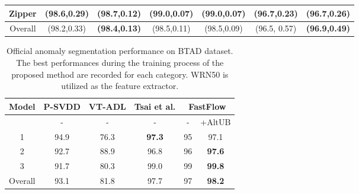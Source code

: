 \documentclass[letterpaper]{article}
\begin{document}
\begin{table*}[t]
\begin{tabular}{c|cccc|cc}
Zipper     & \multicolumn{1}{c}{(98.6,0.29)}          & \multicolumn{1}{c|}{\textbf{(98.7,0.12)}} & \multicolumn{1}{c}{(99.0,0.07)} & \multicolumn{1}{c|}{(99.0,0.07)}          & \multicolumn{1}{c}{(96.7,0.23)}  & (96.7,0.26)          \\ \hline
Overall    & \multicolumn{1}{c}{(98.2,0.33)}          & \multicolumn{1}{c|}{\textbf{(98.4,0.13)}} & \multicolumn{1}{c}{(98.5,0.11)} & \multicolumn{1}{c|}{(98.5,0.09)}          & \multicolumn{1}{c}{(96.5, 0.57)} & \textbf{(96.9,0.49)} \\ \hline
\end{tabular}
\end{table*}

\begin{table}[t]
\caption{Official anomaly segmentation performance on BTAD dataset. The best performances during the training process of the proposed method are recorded for each category. WRN50 is utilized as the feature extractor.}
\label{table-btad-best}
\centering
\small{
\begin{tabular}{c|c|c|c|cc}
\hline
Model & P-SVDD & VT-ADL & Tsai et al.   & \multicolumn{2}{c}{FastFlow}          \\ \hline
      & -      & -      & -             & \multicolumn{1}{c}{-} & +AltUB        \\ \hline
1     & 94.9   & 76.3   & \textbf{97.3} & 95                     & 97.1          \\
2     & 92.7   & 88.9   & 96.8          & 96                     & \textbf{97.6}          \\
3     & 91.7   & 80.3   & 99.0          & 99                     & \textbf{99.8} \\ \hline
Overall  & 93.1   & 81.8   & 97.7          & 97                     & \textbf{98.2} \\ \hline
\end{tabular}
}
\end{table}
\end{document}

